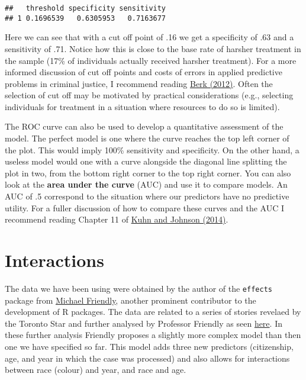 \documentclass[
]{book}
\begin{document}
\begin{verbatim}
##   threshold specificity sensitivity
## 1 0.1696539   0.6305953   0.7163677
\end{verbatim}

Here we can see that with a cut off point of .16 we get a specificity of .63 and a sensitivity of .71. Notice how this is close to the base rate of harsher treatment in the sample (17\% of individuals actually received harsher treatment). For a more informed discussion of cut off points and costs of errors in applied predictive problems in criminal justice, I recommend reading \href{http://link.springer.com/book/10.1007\%2F978-1-4614-3085-8}{Berk (2012)}. Often the selection of cut off may be motivated by practical considerations (e.g., selecting individuals for treatment in a situation where resources to do so is limited).

The ROC curve can also be used to develop a quantitative assessment of the model. The perfect model is one where the curve reaches the top left corner of the plot. This would imply 100\% sensitivity and specificity. On the other hand, a useless model would one with a curve alongside the diagonal line splitting the plot in two, from the bottom right corner to the top right corner. You can also look at the \textbf{area under the curve} (AUC) and use it to compare models. An AUC of .5 correspond to the situation where our predictors have no predictive utility. For a fuller discussion of how to compare these curves and the AUC I recommend reading Chapter 11 of \href{http://link.springer.com/book/10.1007/978-1-4614-6849-3}{Kuhn and Johnson (2014)}.

\section{Interactions}\label{interactions}

The data we have been using were obtained by the author of the \texttt{effects} package from \href{http://www.datavis.ca/}{Michael Friendly}, another prominent contributor to the development of R packages. The data are related to a series of stories revelaed by the Toronto Star and further analysed by Professor Friendly as seen \href{http://www.datavis.ca/courses/VCD/vcd4-handout-2x2.pdf}{here}. In these further analysis Friendly proposes a slightly more complex model than then one we have specified so far. This model adds three new predictors (citizenship, age, and year in which the case was processed) and also allows for interactions between race (colour) and year, and race and age.
\end{document}
